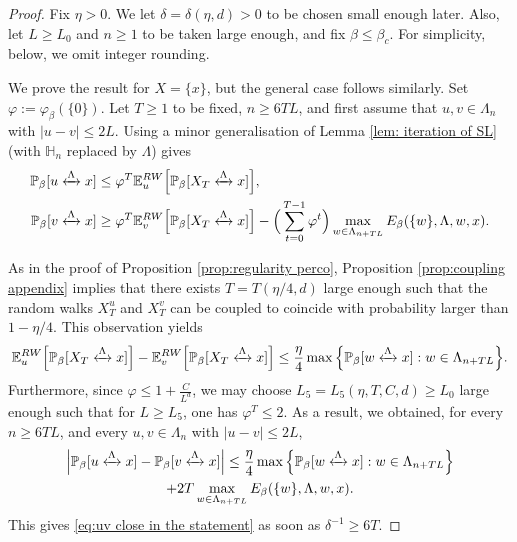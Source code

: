 \documentclass[11pt,a4paper]{article}
\numberwithin{equation}{section}
\theoremstyle{plain}
\theoremstyle{definition}
\newcommand{\connect}{\xleftrightarrow}
\begin{document}
\begin{proof} Fix $\eta>0$. We let $\delta=\delta(\eta,d)>0$ to be chosen small enough later. Also, let $L\geq L_0$  and $n\geq 1$ to be taken large enough, and fix $\beta\leq\beta_c$. For simplicity, below, we omit integer rounding.


We prove the result for $X=\{x\}$, but the general case follows similarly. Set $\varphi:=\varphi_\beta(\{0\})$. Let $T\geq 1$ to be fixed, $n\geq 6TL$, and first assume that $u,v\in \Lambda_{n}$ with $|u-v|\leq 2L$. Using a minor generalisation of Lemma \ref{lem: iteration of SL} (with $\mathbb H_n$ replaced by $\Lambda$) gives
\begin{align}\label{eq:r1perco}
	\mathbb P_\beta[u\connect{\Lambda\:}x]&\leq \varphi^T\mathbb E_{u}^{\rm RW}\Big[\mathbb P_\beta[X_T\connect{\Lambda\:}x]\Big],\\	\mathbb P_\beta[v\connect{\Lambda\:}x]&\geq \varphi^T\mathbb E_{v}^{\rm RW}\Big[\mathbb P_\beta[X_T\connect{\Lambda\:}x]\Big]-\Big(\sum_{t=0}^{T-1}\varphi^t\Big)\max_{w\in \Lambda_{n+TL}}E_\beta(\{w\},\Lambda,w,x).\label{eq:r2perco}
\end{align}


As in the proof of Proposition \ref{prop:regularity perco}, Proposition \ref{prop:coupling appendix} implies that there exists $T=T(\eta/4,d)$ large enough such that the random walks $X_T^u$ and $X_T^v$ can be coupled to coincide with probability larger than $1-\eta/4$. This observation yields
\begin{equation}\label{eq: coupling micro scales perco}
\mathbb E_{u}^{\rm RW}\Big[\mathbb P_\beta[X_T\connect{\Lambda\:}x]\Big]-\mathbb E_{v}^{\rm RW}\Big[\mathbb P_\beta[X_T\connect{\Lambda\:}x]\Big]\le \frac{\eta}{4}\max\Big\{\mathbb P_\beta[w\connect{\Lambda\:}x]:w\in \Lambda_{n+TL}\Big\}.
\end{equation}
 Furthermore, since $\varphi\le 1+\tfrac{C}{L^d}$, we may choose $L_5=L_5(\eta,T,C,d)\geq L_0$ large enough such that for $L\geq L_5$, one has $\varphi^T\leq 2$. As a result, we obtained, for every $n\geq 6TL$, and every $u,v\in \Lambda_n$ with $|u-v|\leq 2L$,
 \begin{multline}\label{eq: uv close lower bounds}
 	\Big|\mathbb P_\beta[u\connect{\Lambda\:}x]-\mathbb P_\beta[v\connect{\Lambda\:}x]\Big|\leq \frac{\eta}{4}\max\Big\{\mathbb P_\beta[w\connect{\Lambda\:}x]:w\in \Lambda_{n+TL}\Big\}\\+2T\max_{w\in \Lambda_{n+TL}}E_\beta(\{w\},\Lambda,w,x).
 \end{multline}
 This gives \eqref{eq:uv close in the statement} as soon as $\delta^{-1}\geq 6T$.
 

\end{proof}
\end{document}
